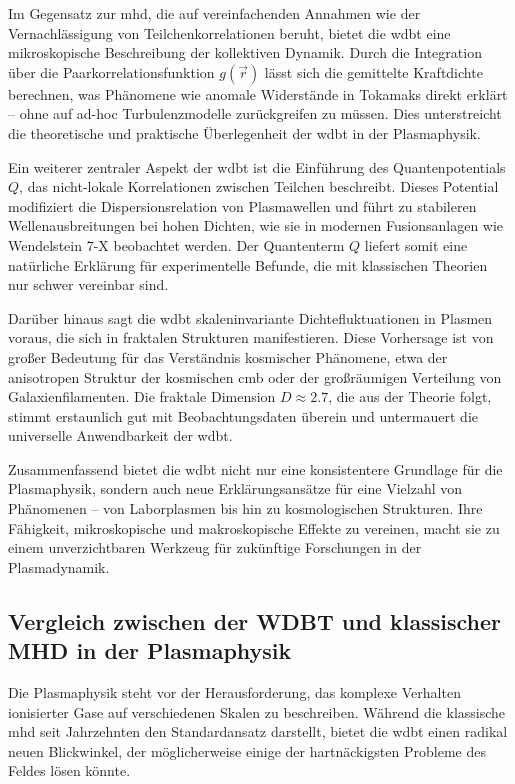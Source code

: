 Im Gegensatz zur \gls{mhd}, die auf vereinfachenden Annahmen wie der Vernachlässigung von Teilchenkorrelationen beruht, bietet die \gls{wdbt} eine mikroskopische Beschreibung der
kollektiven Dynamik. Durch die Integration über die Paarkorrelationsfunktion $g(\vec{r})$ lässt sich die gemittelte Kraftdichte berechnen, was Phänomene wie anomale Widerstände
in Tokamaks direkt erklärt – ohne auf ad-hoc Turbulenzmodelle zurückgreifen zu müssen. Dies unterstreicht die theoretische und praktische Überlegenheit der \gls{wdbt} in der
Plasmaphysik.

Ein weiterer zentraler Aspekt der \gls{wdbt} ist die Einführung des Quantenpotentials $Q$, das nicht-lokale Korrelationen zwischen Teilchen beschreibt. Dieses Potential modifiziert
die Dispersionsrelation von Plasmawellen und führt zu stabileren Wellenausbreitungen bei hohen Dichten, wie sie in modernen Fusionsanlagen wie Wendelstein 7-X beobachtet werden.
Der Quantenterm $Q$ liefert somit eine natürliche Erklärung für experimentelle Befunde, die mit klassischen Theorien nur schwer vereinbar sind.

Darüber hinaus sagt die \gls{wdbt} skaleninvariante Dichtefluktuationen in Plasmen voraus, die sich in fraktalen Strukturen manifestieren. Diese Vorhersage ist von großer Bedeutung
für das Verständnis kosmischer Phänomene, etwa der anisotropen Struktur der kosmischen \gls{cmb} oder der großräumigen Verteilung von Galaxienfilamenten. Die fraktale Dimension
$D \approx 2.7$, die aus der Theorie folgt, stimmt erstaunlich gut mit Beobachtungsdaten überein und untermauert die universelle Anwendbarkeit der \gls{wdbt}.

Zusammenfassend bietet die \gls{wdbt} nicht nur eine konsistentere Grundlage für die Plasmaphysik, sondern auch neue Erklärungsansätze für eine Vielzahl von Phänomenen – von
Laborplasmen bis hin zu kosmologischen Strukturen. Ihre Fähigkeit, mikroskopische und makroskopische Effekte zu vereinen, macht sie zu einem unverzichtbaren Werkzeug für zukünftige
Forschungen in der Plasmadynamik.

\subsection{Vergleich zwischen der WDBT und klassischer MHD in der Plasmaphysik}
Die Plasmaphysik steht vor der Herausforderung, das komplexe Verhalten ionisierter Gase auf verschiedenen Skalen zu beschreiben. Während die klassische \gls{mhd} seit Jahrzehnten
den Standardansatz darstellt, bietet die \gls{wdbt} einen radikal neuen Blickwinkel, der möglicherweise einige der hartnäckigsten Probleme des Feldes lösen könnte.


